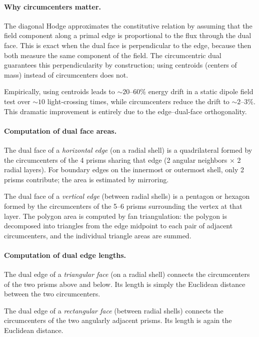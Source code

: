 \documentclass[11pt,a4paper]{article}
\begin{document}
\paragraph{Why circumcenters matter.}
The diagonal Hodge approximates the constitutive relation by assuming that the
field component along a primal edge is proportional to the flux through the
dual face. This is exact when the dual face is perpendicular to the edge,
because then both measure the same component of the field. The circumcentric
dual guarantees this perpendicularity by construction; using centroids (centers
of mass) instead of circumcenters does not.

Empirically, using centroids leads to $\sim 20$--$60\%$ energy drift in a
static dipole field test over $\sim 10$ light-crossing times, while
circumcenters reduce the drift to $\sim 2$--$3\%$. This dramatic improvement
is entirely due to the edge--dual-face orthogonality.

\paragraph{Computation of dual face areas.}
The dual face of a \emph{horizontal edge} (on a radial shell) is a
quadrilateral formed by the circumcenters of the 4 prisms sharing that edge
(2 angular neighbors $\times$ 2 radial layers). For boundary edges on the
innermost or outermost shell, only 2 prisms contribute; the area is estimated
by mirroring.

The dual face of a \emph{vertical edge} (between radial shells) is a pentagon
or hexagon formed by the circumcenters of the 5--6 prisms surrounding the
vertex at that layer. The polygon area is computed by fan triangulation: the
polygon is decomposed into triangles from the edge midpoint to each pair of
adjacent circumcenters, and the individual triangle areas are summed.

\paragraph{Computation of dual edge lengths.}
The dual edge of a \emph{triangular face} (on a radial shell) connects the
circumcenters of the two prisms above and below. Its length is simply the
Euclidean distance between the two circumcenters.

The dual edge of a \emph{rectangular face} (between radial shells) connects
the circumcenters of the two angularly adjacent prisms. Its length is again
the Euclidean distance.
\end{document}
